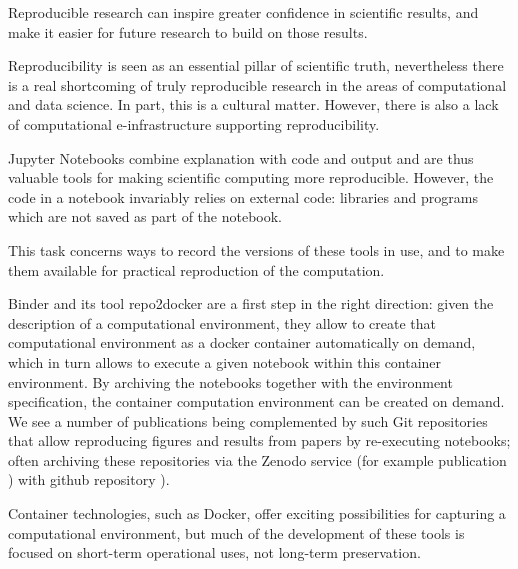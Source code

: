 \begin{task}[
  title=Archiving software environments for reproducible computation,
  id=reproducibility,
  lead=XFEL,
  PM=36,
  wphases={1-36},
  partners={XFEL,WTT,SRL,UPSUD,QS}
]

  Reproducible research can inspire greater confidence in scientific results,
  and make it easier for future research to build on those results.

  Reproducibility is seen as an essential pillar of scientific truth,
  nevertheless there is a real shortcoming of truly reproducible
  research in the areas of computational and data science. In part,
  this is a cultural matter. However, there is also a lack of
  computational e-infrastructure supporting reproducibility.
  \medskip

  Jupyter Notebooks combine explanation with code and output and are
  thus valuable tools for making scientific computing more
  reproducible. However, the code in a notebook invariably relies on
  external code: libraries and programs which are not saved as part of
  the notebook.

  This task concerns ways to record the versions of these tools in use, and to
  make them available for practical reproduction of the computation.

  Binder and its tool repo2docker are a first step in the right
  direction: given the description of a computational environment,
  they allow to create that computational environment as a docker
  container automatically on demand, which in turn allows to execute a
  given notebook within this container environment. By archiving the
  notebooks together with the environment specification, the container
  computation environment can be created on demand. We see a number of
  publications being complemented by such Git repositories that allow
  reproducing figures and results from papers by re-executing
  notebooks; often archiving these repositories via the Zenodo
  service (for example publication \cite{CortsOrtuo2018}) with github
  repository \cite{GithubRepoExampleCortes2018}).

  Container technologies, such as Docker, offer exciting possibilities
  for capturing a computational environment, but much of the
  development of these tools is focused on short-term operational
  uses, not long-term preservation.


\end{task}

